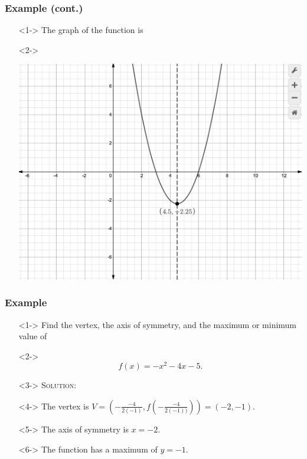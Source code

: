 \documentclass[handout]{beamer}
\begin{document}
\begin{frame}
	\frametitle{Example (cont.)} 
	\begin{enumerate}
		\item[]<1-> The graph of the function is 
		\item[]<2->\begin{center}
				\includegraphics[scale=0.25]{3_3_6.png} 		
			\end{center} 
	\end{enumerate}
\end{frame}

\begin{frame}
	\frametitle{Example} 
	\begin{enumerate}
		\item[]<1-> Find the vertex, the axis of symmetry, and the maximum or minimum value of 
		\item[]<2->\[ f(x)=-x^{2}-4x-5. \] 
		\item[]<3-> \textsc{Solution:} 
		\item[]<4-> The vertex is $V=\left( -\frac{-4}{2(-1)}, f \left( -\frac{-4}{2(-1))} \right)\right)=\left( -2,  -1 \right)$. 
		\item[]<5-> The axis of symmetry is $x=-2$. 
		\item[]<6-> The function has a maximum of $y=-1$.  
	\end{enumerate}
\end{frame}
\end{document}
